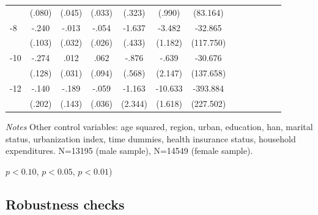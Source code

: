 \begin{table}[p]
\begin{adjustbox}{max width=\linewidth}
\begin{threeparttable}
{\begin{tabular}{l*{6}{S S}}
                &   (.080)         &   (.045)         &   (.033)         &   (.323)         &   (.990)         & (83.164)         \\
-8             &    -.240\sym{**} &    -.013         &    -.054\sym{**} &   -1.637\sym{***}&   -3.482\sym{***}&  -32.865         \\
                &   (.103)         &   (.032)         &   (.026)         &   (.433)         &  (1.182)         &(117.750)         \\
-10            &    -.274\sym{**} &     .012         &     .062         &    -.876         &    -.639         &  -30.676         \\
                &   (.128)         &   (.031)         &   (.094)         &   (.568)         &  (2.147)         &(137.658)         \\
-12           &    -.140         &    -.189         &    -.059         &   -1.163         &  -10.633\sym{***}& -393.884\sym{*}  \\
                &   (.202)         &   (.143)         &   (.036)         &  (2.344)         &  (1.618)         &(227.502)         \\     
\bottomrule
\end{tabular}
\begin{tablenotes}
\item \textit{Notes} Other control variables: age squared, region, urban, education, han, marital status, urbanization index, time dummies, health insurance status, household expenditures. N=13195 (male sample), N=14549 (female sample).
\item \sym{*} \(p<0.10\), \sym{**} \(p<0.05\), \sym{***} \(p<0.01\))
\end{tablenotes}
}
\end{threeparttable}
\end{adjustbox}
\end{table}
\FloatBarrier

\clearpage
\subsection*{Robustness checks}

